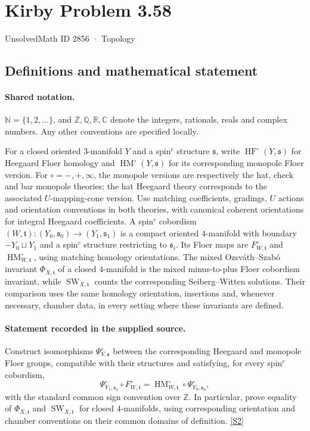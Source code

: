\documentclass[11pt]{article}
\newcommand{\sref}[2]{\hyperlink{source:#1:#2}{[S#2]}}
\begin{document}
\setcounter{section}{2855}
\section{Kirby Problem 3.58}\label{2856}
{\small\sffamily UnsolvedMath ID 2856 · Topology}
\subsection{Definitions and mathematical statement}

\paragraph{Shared notation.}$\mathbb N=\{1,2,\ldots\}$, and $\mathbb Z,\mathbb Q,\mathbb R,\mathbb C$ denote the integers, rationals, reals and complex numbers. Any other conventions are specified locally.


For a closed oriented $3$-manifold $Y$ and a spin$^c$ structure $\mathfrak s$, write $\operatorname{HF}^{\circ}(Y,\mathfrak s)$ for Heegaard Floer homology and $\operatorname{HM}^{\circ}(Y,\mathfrak s)$ for its corresponding monopole Floer version. For $\circ=-,+,\infty$, the monopole versions are respectively the hat, check and bar monopole theories; the hat Heegaard theory corresponds to the associated $U$-mapping-cone version. Use matching coefficients, gradings, $U$ actions and orientation conventions in both theories, with canonical coherent orientations for integral Heegaard coefficients.
A spin$^c$ cobordism $(W,\mathfrak t):(Y_0,\mathfrak s_0)\to(Y_1,\mathfrak s_1)$ is a compact oriented $4$-manifold with boundary $-Y_0\sqcup Y_1$ and a spin$^c$ structure restricting to $\mathfrak s_i$. Its Floer maps are $F^{\circ}_{W,\mathfrak t}$ and $\operatorname{HM}^{\circ}_{W,\mathfrak t}$, using matching homology orientations. The mixed Ozsv\'ath--Szab\'o invariant $\Phi_{X,\mathfrak t}$ of a closed $4$-manifold is the mixed minus-to-plus Floer cobordism invariant, while $\operatorname{SW}_{X,\mathfrak t}$ counts the corresponding Seiberg--Witten solutions. Their comparison uses the same homology orientation, insertions and, whenever necessary, chamber data, in every setting where these invariants are defined.
\paragraph{Statement recorded in the supplied source.}
Construct isomorphisms $\Psi^{\circ}_{Y,\mathfrak s}$ between the corresponding Heegaard and monopole Floer groups, compatible with their structures and satisfying, for every spin$^c$ cobordism,
\[
\Psi^{\circ}_{Y_1,\mathfrak s_1}\circ F^{\circ}_{W,\mathfrak t}
=\operatorname{HM}^{\circ}_{W,\mathfrak t}\circ\Psi^{\circ}_{Y_0,\mathfrak s_0},
\]
with the standard common sign convention over $\mathbb Z$. In particular, prove equality of $\Phi_{X,\mathfrak t}$ and $\operatorname{SW}_{X,\mathfrak t}$ for closed $4$-manifolds, using corresponding orientation and chamber conventions on their common domains of definition. \sref{2856}{2}
\end{document}
